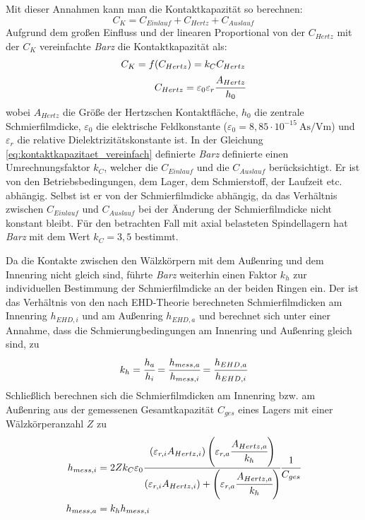 Mit dieser Annahmen kann man die Kontaktkapazität so berechnen:
%
\begin{equation}
    C_K = C_{Einlauf} + C_{Hertz} + C_{Auslauf}
    \label{eq:kontaktkapazitaet}
\end{equation}
%
Aufgrund dem großen Einfluss und der linearen Proportional von der $C_{Hertz}$ mit der $C_K$ vereinfachte \textit{Barz} die Kontaktkapazität als:
%
\begin{align}
    C_K = f(C_{Hertz}) = k_C C_{Hertz} \\
    C_{Hertz} = \varepsilon_0 \varepsilon_r \cfrac{A_{Hertz}}{h_0}
    \label{eq:kontaktkapazitaet_vereinfach}
\end{align}
%
wobei $A_{Hertz}$ die Größe der Hertzschen Kontaktfläche, $h_0$ die zentrale Schmierfilmdicke, $\varepsilon_0$ die elektrische Feldkonstante ($\varepsilon_0 = 8,85 \cdot 10^{-15} \ \textrm{As/Vm}$) und $\varepsilon_r$ die relative Dielektrizitätskonstante ist.
In der Gleichung \ref{eq:kontaktkapazitaet_vereinfach} definierte \textit{Barz} definierte einen Umrechnungsfaktor $k_C$, welcher die $C_{Einlauf}$ und die $C_{Auslauf}$ berücksichtigt.
Er ist von den Betriebsbedingungen, dem Lager, dem Schmierstoff, der Laufzeit etc. abhängig.
Selbst ist er von der Schmierfilmdicke abhängig, da das Verhältnis zwischen $C_{Einlauf}$ und $C_{Auslauf}$ bei der Änderung der Schmierfilmdicke nicht konstant bleibt.
Für den betrachten Fall mit axial belasteten Spindellagern hat \textit{Barz} mit dem Wert $k_C = 3,5$ bestimmt.

Da die Kontakte zwischen den Wälzkörpern mit dem Außenring und dem Innenring nicht gleich sind, führte \textit{Barz} weiterhin einen Faktor $k_h$ zur individuellen Bestimmung der Schmierfilmdicke an der beiden Ringen ein.
Der ist das Verhältnis von den nach EHD-Theorie berechneten Schmierfilmdicken am Innenring $h_{EHD,i}$ und am Außenring $h_{EHD,a}$ und berechnet sich unter einer Annahme, dass die Schmierungbedingungen am Innenring und Außenring gleich sind, zu
%
\begin{equation}
    k_h = \cfrac{h_a}{h_i} = \cfrac{h_{mess,a}}{h_{mess,i}} = \cfrac{h_{EHD,a}}{h_{EHD,i}}
    \label{eq:kh_faktor}
\end{equation}
%
Schließlich berechnen sich die Schmierfilmdicken am Innenring bzw. am Außenring aus der gemessenen Gesamtkapazität $C_{ges}$ eines Lagers mit einer Wälzkörperanzahl $Z$ zu
%
\begin{align}
    h_{mess,i} &= 2 Z k_C \varepsilon_0 
                \cfrac{(\varepsilon_{r,i} A_{Hertz,i}) \left( \varepsilon_{r,a} \cfrac{A_{Hertz,a}}{k_h} \right) }
                      {(\varepsilon_{r,i} A_{Hertz,i}) + \left( \varepsilon_{r,a} \cfrac{A_{Hertz,a}}{k_h} \right) }
                \cfrac{1}{C_{ges}} \\
    h_{mess,a} &= k_h h_{mess,i}
\end{align}
%


